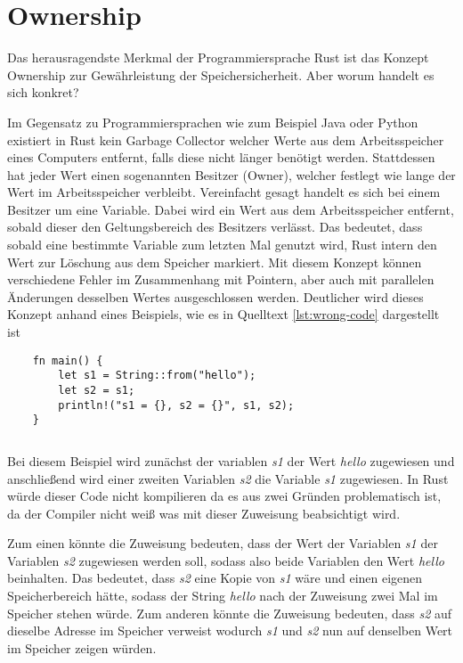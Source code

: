 \section{Ownership}

Das herausragendste Merkmal der Programmiersprache Rust ist das Konzept Ownership zur Gewährleistung der Speichersicherheit. Aber worum handelt es sich konkret?

Im Gegensatz zu Programmiersprachen wie zum Beispiel Java oder Python existiert in Rust kein Garbage Collector welcher Werte aus dem Arbeitsspeicher eines Computers entfernt, falls diese nicht länger benötigt werden. Stattdessen hat jeder Wert einen sogenannten Besitzer (Owner), welcher festlegt wie lange der Wert im Arbeitsspeicher verbleibt. Vereinfacht gesagt handelt es sich bei einem Besitzer um eine Variable. Dabei wird ein Wert aus dem Arbeitsspeicher entfernt, sobald dieser den Geltungsbereich des Besitzers verlässt. Das bedeutet, dass sobald eine bestimmte Variable zum letzten Mal genutzt wird, Rust intern den Wert zur Löschung aus dem Speicher markiert. Mit diesem Konzept können verschiedene Fehler im Zusammenhang mit Pointern, aber auch mit parallelen Änderungen desselben Wertes ausgeschlossen werden. \autocite{rust-the-book}\autocite{rust-by-example} Deutlicher wird dieses Konzept anhand eines Beispiels, wie es in Quelltext \ref{lst:wrong-code} dargestellt ist

\begin{verbatim}
    fn main() {
        let s1 = String::from("hello");
        let s2 = s1;
        println!("s1 = {}, s2 = {}", s1, s2);
    }
\end{verbatim}
\begin{lstlisting}[caption={Fehlerhafte Zuweisung von Werten \\Quelle: \autocite{rust-ownership}}, label={lst:wrong-code}]
\end{lstlisting}

Bei diesem Beispiel wird zunächst der variablen \textit{s1} der Wert \textit{hello} zugewiesen und anschließend wird einer zweiten Variablen \textit{s2} die Variable \textit{s1} zugewiesen. In Rust würde dieser Code nicht kompilieren da es aus zwei Gründen problematisch ist, da der Compiler nicht weiß was mit dieser Zuweisung beabsichtigt wird. \autocite{rust-ownership}\autocite{rust-the-book}\autocite{rust-by-example}

Zum einen könnte die Zuweisung bedeuten, dass der Wert der Variablen \textit{s1} der Variablen \textit{s2} zugewiesen werden soll, sodass also beide Variablen den Wert \textit{hello} beinhalten. Das bedeutet, dass \textit{s2} eine Kopie von \textit{s1} wäre und einen eigenen Speicherbereich hätte, sodass der String \textit{hello} nach der Zuweisung zwei Mal im Speicher stehen würde. Zum anderen könnte die Zuweisung bedeuten, dass \textit{s2} auf dieselbe Adresse im Speicher verweist wodurch \textit{s1} und \textit{s2} nun auf denselben Wert im Speicher zeigen würden.\autocite{rust-ownership}\autocite{rust-the-book}\autocite{rust-by-example}

